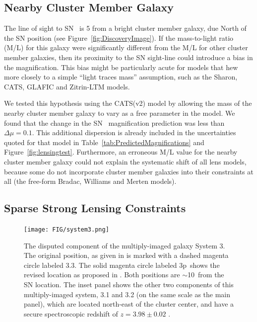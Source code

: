 \subsection{Nearby Cluster Member Galaxy}
\label{sec:NearbyClusterMemberGalaxy}

The line of sight to SN \tomas\ is 5 from a bright cluster
member galaxy, due North of the SN position (see
Figure~\ref{fig:DiscoveryImage}).  If the mass-to-light ratio (M/L)
for this galaxy were significantly different from the M/L for other
cluster member galaxies, then its proximity to the SN sight-line could
introduce a bias in the magnification.  This bias might be
particularly acute for models that hew more closely to a
simple ``light traces mass'' assumption, such as the Sharon, CATS,
GLAFIC and Zitrin-LTM models.

We tested this hypothesis using the CATS(v2) model by allowing the mass
of the nearby cluster member galaxy to vary as a free parameter in the
model. We found that the change in the SN \tomas\ magnification
prediction was less than $\Delta\mu=0.1$.  This additional dispersion
is already included in the uncertainties quoted for that model in
Table~\ref{tab:PredictedMagnifications} and
Figure~\ref{fig:lensingtest}.  Furthermore, an erroneous M/L
value for the nearby cluster member galaxy could not explain the
systematic shift of all lens models, because some do not incorporate
cluster member galaxies into their constraints at all (the free-form
Bradac, Williams and Merten models).

\subsection{Sparse Strong Lensing Constraints}
\label{sec:SparseStrongLensingConstraints}

\begin{figure}
\begin{center}
\texttt{[image: FIG/system3.png]}
\caption{ 
The disputed component of the multiply-imaged galaxy System 3. The
original position, as given in \citet{Merten:2011} is marked with a
dashed magenta circle labeled 3.3. The solid magenta circle
labeled \33p\ shows the revised location as proposed
in \citet{Jauzac:2014c}.  Both positions are $\sim$10\arcsec\ from the
SN location.  The inset panel shows the other two components of this
multiply-imaged system, 3.1 and 3.2 (on the same scale as the main
panel), which are located north-east of the cluster center, and have a
secure spectroscopic redshift of $z=3.98\pm0.02$ \citep{Johnson:2014}.
\label{fig:system3} }
\end{center}
\end{figure}


